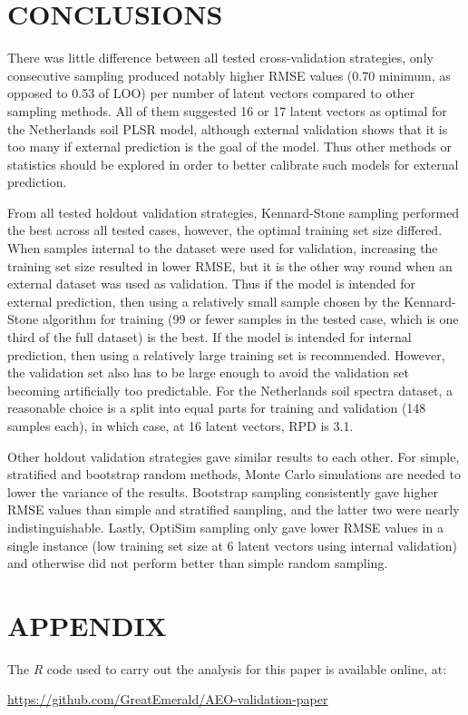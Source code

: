\documentclass{isprs}
\begin{document}
\section{CONCLUSIONS}\label{sec:CONCLUSIONS}

There was little difference between all tested cross-validation strategies, only consecutive sampling produced notably higher RMSE values (0.70 minimum, as opposed to 0.53 of LOO) per number of latent vectors compared to other sampling methods. All of them suggested 16 or 17 latent vectors as optimal for the Netherlands soil PLSR model, although external validation shows that it is too many if external prediction is the goal of the model. Thus other methods or statistics should be explored in order to better calibrate such models for external prediction.

From all tested holdout validation strategies, Kennard-Stone sampling performed the best across all tested cases, however, the optimal training set size differed. When samples internal to the dataset were used for validation, increasing the training set size resulted in lower RMSE, but it is the other way round when an external dataset was used as validation. Thus if the model is intended for external prediction, then using a relatively small sample chosen by the Kennard-Stone algorithm for training (99 or fewer samples in the tested case, which is one third of the full dataset) is the best. If the model is intended for internal prediction, then using a relatively large training set is recommended. However, the validation set also has to be large enough to avoid the validation set becoming artificially too predictable. For the Netherlands soil spectra dataset, a reasonable choice is a split into equal parts for training and validation (148 samples each), in which case, at 16 latent vectors, RPD is 3.1.

Other holdout validation strategies gave similar results to each other. For simple, stratified and bootstrap random methods, Monte Carlo simulations are needed to lower the variance of the results. Bootstrap sampling consistently gave higher RMSE values than simple and stratified sampling, and the latter two were nearly indistinguishable. Lastly, OptiSim sampling only gave lower RMSE values in a single instance (low training set size at 6 latent vectors using internal validation) and otherwise did not perform better than simple random sampling.

{%
	\begin{spacing}{0.9}%
		
	\end{spacing}
}

\section*{APPENDIX}\label{APPENDIX}

The \textit{R} code used to carry out the analysis for this paper is available online, at:

\url{https://github.com/GreatEmerald/AEO-validation-paper}
\end{document}
